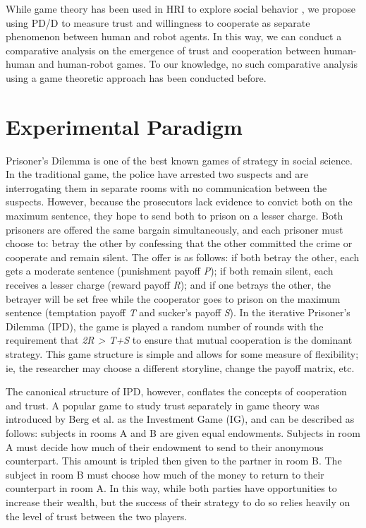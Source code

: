 \documentclass{sig-alternate}
\begin{document}
While game theory has been used in HRI to explore social behavior \cite{lee2008human} \cite{broz2008planning} \cite{mathur2009uncanny}, we propose using PD/D to measure trust and willingness to cooperate as separate phenomenon between human and robot agents. In this way, we can conduct a comparative analysis on the emergence of trust and cooperation between human-human and human-robot games. To our knowledge, no such comparative analysis using a game theoretic approach has been conducted before.

\section{Experimental Paradigm}
Prisoner's Dilemma is one of the best known games of strategy in social science. In the traditional game, the police have arrested two suspects and are interrogating them in separate rooms with no communication between the suspects. However, because the prosecutors lack evidence to convict both on the maximum sentence, they hope to send both to prison on a lesser charge. Both prisoners are offered the same bargain simultaneously, and each prisoner must choose to: betray the other by confessing that the other committed the crime or cooperate and remain silent. The offer is as follows: if both betray the other, each gets a moderate sentence (punishment payoff \textit{P}); if both remain silent, each receives a lesser charge (reward payoff \textit{R}); and if one betrays the other, the betrayer will be set free while the cooperator goes to prison on the maximum sentence (temptation payoff \textit{T} and sucker's payoff \textit{S}). In the iterative Prisoner's Dilemma (IPD), the game is played a random number of rounds with the requirement that \textit{2R > T+S} to ensure that mutual cooperation is the dominant strategy. This game structure is simple and allows for some measure of flexibility; ie, the researcher may choose a different storyline, change the payoff matrix, etc.

The canonical structure of IPD, however, conflates the concepts of cooperation and trust. A popular game to study trust separately in game theory was introduced by Berg et al. \cite{berg1995trust} as the Investment Game (IG), and can be described as follows: subjects in rooms A and B are given equal endowments. Subjects in room A must decide how much of their endowment to send to their anonymous counterpart. This amount is tripled then given to the partner in room B. The subject in room B must choose how much of the money to return to their counterpart in room A. In this way, while both parties have opportunities to increase their wealth, but the success of their strategy to do so relies heavily on the level of trust between the two players.
\end{document}
